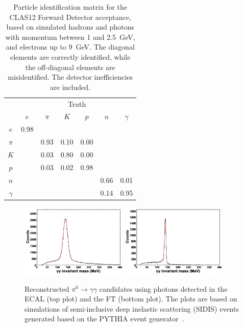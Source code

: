 \begin{table}[htpb]
  \begin{center}
    \begin{tabular}{|c|cccccc|}\hline
          & \multicolumn{6}{c|}{Truth}\\        
          & $e$  & $\pi$ & $K$  & $p$  & $n$  & $\gamma$ \\\hline
  $e$     & 0.98 &       &      &      &      &          \\ 
  $\pi$   &      &  0.93 & 0.10 & 0.00 &      &          \\ 
  $K$     &      &  0.03 & 0.80 & 0.00 &      &          \\ 
  $p$     &      &  0.03 & 0.02 & 0.98 &      &          \\ 
  $n$     &      &       &      &      & 0.66 &   0.01   \\ 
 $\gamma$ &      &       &      &      & 0.14 &   0.95   \\\hline 
    \end{tabular}  
    \caption{Particle identification matrix for the CLAS12 Forward Detector acceptance, based on simulated hadrons
      and photons with momentum between 1 and 2.5~GeV, and electrons up to 9~GeV. The diagonal elements are
      correctly identified, while the off-diagonal elements are misidentified. The detector inefficiencies are included.}
  \label{table:pidmatrix}
  \end{center}
\end{table}

\begin{figure}[t]
\centering
\includegraphics[width=0.45\textwidth]{pics/ecal_pi0.png}
\includegraphics[width=0.45\textwidth]{pics/ft_pi0.png}
\caption{Reconstructed $\pi^0 \to \gamma \gamma$ candidates using photons detected in the ECAL (top plot) and
  the FT (bottom plot). The plots are based on simulations of semi-inclusive deep inelastic scattering (SIDIS) events
  generated based on the PYTHIA event generator~\cite{clasdis}.}
\label{fig:pi0mass}
\end{figure}

